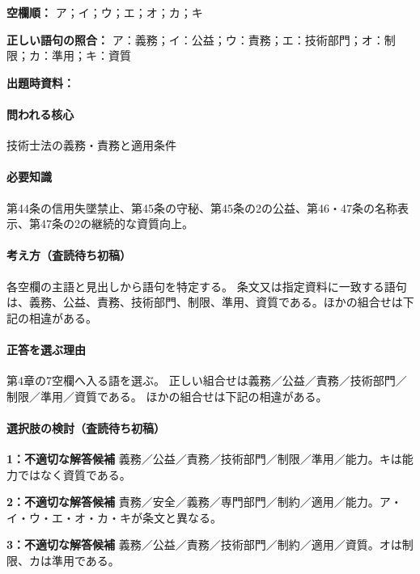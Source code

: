 \noindent\textbf{空欄順：} ア；イ；ウ；エ；オ；カ；キ\par

\noindent\textbf{正しい語句の照合：} ア：義務；イ：公益；ウ：責務；エ：技術部門；オ：制限；カ：準用；キ：資質\par

\noindent\textbf{出題時資料：} \par

\paragraph{問われる核心} 技術士法の義務・責務と適用条件

\paragraph{必要知識} 第44条の信用失墜禁止、第45条の守秘、第45条の2の公益、第46・47条の名称表示、第47条の2の継続的な資質向上。

\paragraph{考え方（査読待ち初稿）} 各空欄の主語と見出しから語句を特定する。 条文又は指定資料に一致する語句は、義務、公益、責務、技術部門、制限、準用、資質である。ほかの組合せは下記の相違がある。

\paragraph{正答を選ぶ理由} 第4章の7空欄へ入る語を選ぶ。 正しい組合せは義務／公益／責務／技術部門／制限／準用／資質である。 ほかの組合せは下記の相違がある。

\paragraph{選択肢の検討（査読待ち初稿）}\mbox{}\par

\noindent\textbf{1：不適切な解答候補} 義務／公益／責務／技術部門／制限／準用／能力。キは能力ではなく資質である。\par

\noindent\textbf{2：不適切な解答候補} 責務／安全／義務／専門部門／制約／適用／能力。ア・イ・ウ・エ・オ・カ・キが条文と異なる。\par

\noindent\textbf{3：不適切な解答候補} 義務／公益／責務／技術部門／制約／適用／資質。オは制限、カは準用である。\par

